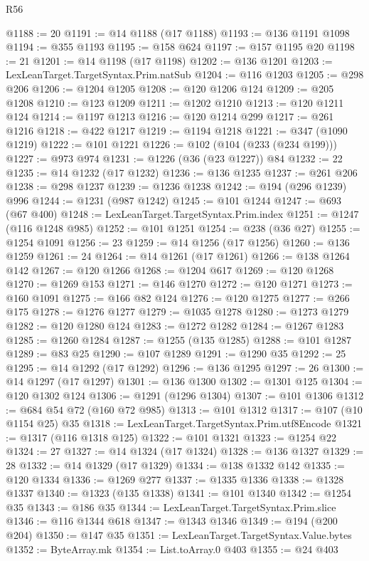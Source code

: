 \begin{lexlean}{R56}
\begin{coremodule}
@1188 := 20
@1191 := @14 @1188 (@17 @1188)
@1193 := @136 @1191 @1098
@1194 := @355 @1193
@1195 := @158 @624
@1197 := @157 @1195 @20
@1198 := 21
@1201 := @14 @1198 (@17 @1198)
@1202 := @136 @1201
@1203 := LexLeanTarget.TargetSyntax.Prim.natSub
@1204 := @116 @1203
@1205 := @298 @206
@1206 := @1204 @1205
@1208 := @120 @1206 @124
@1209 := @205 @1208
@1210 := @123 @1209
@1211 := @1202 @1210
@1213 := @120 @1211 @124
@1214 := @1197 @1213
@1216 := @120 @1214 @299
@1217 := @261 @1216
@1218 := @422 @1217
@1219 := @1194 @1218
@1221 := @347 (@1090 @1219)
@1222 := @101 @1221
@1226 := @102 (@104 (@233 (@234 @199)))
@1227 := @973 @974
@1231 := @1226 (@36 (@23 @1227)) @84
@1232 := 22
@1235 := @14 @1232 (@17 @1232)
@1236 := @136 @1235
@1237 := @261 @206
@1238 := @298 @1237
@1239 := @1236 @1238
@1242 := @194 (@296 @1239) @996
@1244 := @1231 (@987 @1242)
@1245 := @101 @1244
@1247 := @693 (@67 @400)
@1248 := LexLeanTarget.TargetSyntax.Prim.index
@1251 := @1247 (@116 @1248 @985)
@1252 := @101 @1251
@1254 := @238 (@36 @27)
@1255 := @1254 @1091
@1256 := 23
@1259 := @14 @1256 (@17 @1256)
@1260 := @136 @1259
@1261 := 24
@1264 := @14 @1261 (@17 @1261)
@1266 := @138 @1264 @142
@1267 := @120 @1266
@1268 := @1204 @617
@1269 := @120 @1268
@1270 := @1269 @153
@1271 := @146 @1270
@1272 := @120 @1271
@1273 := @160 @1091
@1275 := @166 @82 @124
@1276 := @120 @1275
@1277 := @266 @175
@1278 := @1276 @1277
@1279 := @1035 @1278
@1280 := @1273 @1279
@1282 := @120 @1280 @124
@1283 := @1272 @1282
@1284 := @1267 @1283
@1285 := @1260 @1284
@1287 := @1255 (@135 @1285)
@1288 := @101 @1287
@1289 := @83 @25
@1290 := @107 @1289
@1291 := @1290 @35
@1292 := 25
@1295 := @14 @1292 (@17 @1292)
@1296 := @136 @1295
@1297 := 26
@1300 := @14 @1297 (@17 @1297)
@1301 := @136 @1300
@1302 := @1301 @125
@1304 := @120 @1302 @124
@1306 := @1291 (@1296 @1304)
@1307 := @101 @1306
@1312 := @684 @54 @72 (@160 @72 @985)
@1313 := @101 @1312
@1317 := @107 (@10 @1154 @25) @35
@1318 := LexLeanTarget.TargetSyntax.Prim.utf8Encode
@1321 := @1317 (@116 @1318 @125)
@1322 := @101 @1321
@1323 := @1254 @22
@1324 := 27
@1327 := @14 @1324 (@17 @1324)
@1328 := @136 @1327
@1329 := 28
@1332 := @14 @1329 (@17 @1329)
@1334 := @138 @1332 @142
@1335 := @120 @1334
@1336 := @1269 @277
@1337 := @1335 @1336
@1338 := @1328 @1337
@1340 := @1323 (@135 @1338)
@1341 := @101 @1340
@1342 := @1254 @35
@1343 := @186 @35
@1344 := LexLeanTarget.TargetSyntax.Prim.slice
@1346 := @116 @1344 @618
@1347 := @1343 @1346
@1349 := @194 (@200 @204)
@1350 := @147 @35
@1351 := LexLeanTarget.TargetSyntax.Value.bytes
@1352 := ByteArray.mk
@1354 := List.toArray.{0} @403
@1355 := @24 @403

\end{coremodule}
\end{lexlean}
